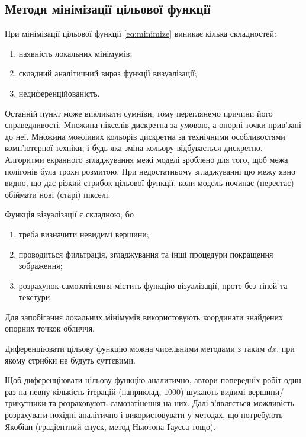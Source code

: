 \subsection{Методи мінімізації цільової функції}

При мінімізації цільової функції \eqref{eq:minimize}
виникає кілька складностей:
\begin{enumerate}
  \item наявність локальних мінімумів;
  \item складний аналітичний вираз функції визуалізації;
  \item недиференційованість.
\end{enumerate}

Останній пункт може викликати сумніви,
тому переглянемо причини його справедливості.
Множина пікселів дискретна за умовою, а опорні точки прив'зані до неї.
Множина можливих кольорів дискретна за технічними особливостями
комп'ютерної техніки, і будь-яка зміна кольору відбувається дискретно.
Алгоритми екранного згладжування межі моделі зроблено для того,
щоб межа полігонів була трохи розмитою.
При недостатньому згладжуванні цю межу явно видно,
що дає різкий стрибок цільової функції,
коли модель починає (перестає) обіймати нові (старі) пікселі.

Функція візуалізації є складною, бо
\begin{enumerate}
  \item
    треба визначити невидимі вершини;
  \item
    проводиться фильтрація,
    згладжування та інші процедури покращення зображення;
  \item
    розрахунок самозатінення містить функцію візуалізації,
    проте без тіней та текстури.
\end{enumerate}

Для запобігання локальних мінімумів
використовують координати знайдених опорних точкок обличчя.

Диференціювати цільову функцію можна чисельними методами з таким $dx$,
при якому стрибки не будуть суттєвими.

Щоб диференціювати цільову функцію аналитично,
автори попередніх робіт один раз на певну кількість ітерацій
(наприклад, $1000$)
шукають видимі вершини/трикутники та розраховують самозатінення на них.
Далі з'являється можливість розрахувати похідні аналітично
і використовувати у методах, що потребують Якобіан
(градіентний спуск, метод Ньютона-Ґаусса тощо).
